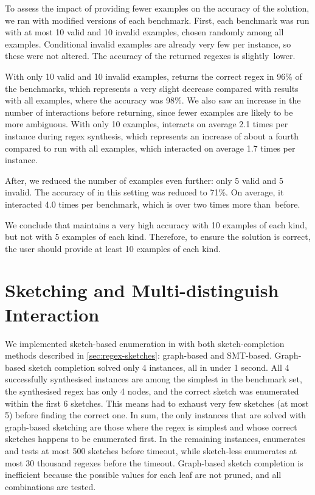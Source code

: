 To assess the impact of providing fewer examples on the accuracy of the solution, we ran \Forest{} with modified versions of each benchmark.
First, each benchmark was run with at most 10 valid and 10 invalid examples, chosen randomly among all examples. Conditional invalid examples are already very few per instance, so these were not altered. The accuracy of the returned regexes is slightly~lower.

With only 10 valid and 10 invalid examples, \Forest{} returns the correct regex in 96\% of the benchmarks, which represents a very slight decrease compared with results with all examples, where the accuracy was 98\%.
We also saw an increase in the number of interactions before returning, since fewer examples are likely to be more ambiguous. With only 10 examples, \Forest{} interacts on average 2.1 times per instance during regex synthesis, which represents an increase of about a fourth compared to \Forest run with all examples, which interacted on average 1.7 times per instance.

After, we reduced the number of examples even further: only 5 valid and 5 invalid. The accuracy of \Forest{} in this setting was reduced to 71\%. On average, it interacted 4.0 times per benchmark, which is over two times more than~before.

We conclude that \Forest{} maintains a very high accuracy with 10 examples of each kind, but not with 5 examples of each kind. Therefore, to ensure the solution is correct, the user should provide \Forest at least 10 examples of each kind.


\section{Sketching and Multi-distinguish Interaction}
\label{sec:res-sketching-interaction}

We implemented sketch-based enumeration in \Forest with both sketch-completion methods described in \autoref{sec:regex-sketches}: graph-based and \ac{SMT}-based.
%
Graph-based sketch completion solved only 4 instances, all in under 1 second. All 4 successfully synthesised instances are among the simplest in the benchmark set, the synthesised regex has only 4 nodes, and the correct sketch was enumerated within the first 6 sketches. This means \Forest had to exhaust very few sketches (at most 5) before finding the correct one. In sum, the only instances that are solved with graph-based sketching are those where the regex is simplest and whose correct sketches happens to be enumerated first. In the remaining instances, \Forest enumerates and tests at most 500 sketches before timeout, while sketch-less \Forest enumerates at most 30 thousand regexes before the timeout. Graph-based sketch completion is inefficient because the possible values for each leaf are not pruned, and all combinations are tested.

